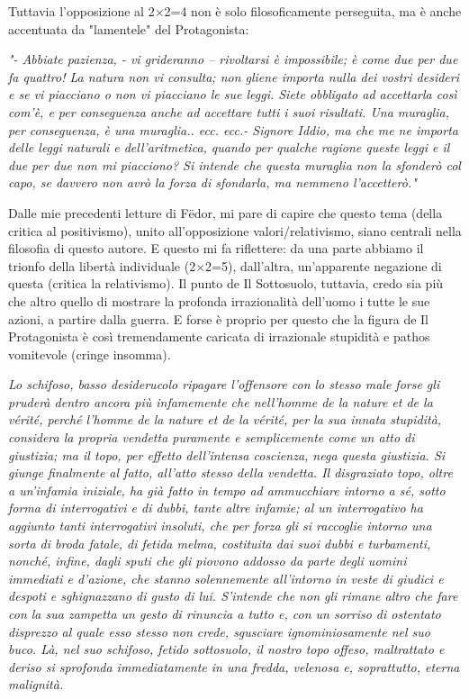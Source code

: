 \documentclass[12pt,a4paper]{report}
\theoremstyle{definition}
\theoremstyle{Theorem}
\theoremstyle{definition}
\theoremstyle{definition}
\theoremstyle{definition}
\begin{document}
Tuttavia l'opposizione al 2$\times$2=4 non è solo filosoficamente perseguita, ma è anche accentuata da "lamentele" del Protagonista: \\
\begin{center}
\textit{
	"- Abbiate pazienza, - vi grideranno – rivoltarsi è impossibile; è come due per due fa quattro! La natura non vi consulta; non gliene importa nulla dei vostri desideri e se vi piacciano o non vi piacciano le sue leggi. Siete obbligato ad accettarla così com'è, e per conseguenza anche ad accettare tutti i suoi risultati. Una muraglia, per conseguenza, è una muraglia.. ecc. ecc.-
	Signore Iddio, ma
	che me ne importa delle leggi naturali e dell’aritmetica, quando per qualche
	ragione queste leggi e il due per due non mi piacciono? Si intende che questa
	muraglia non la sfonderò col capo, se davvero non avrò la forza di sfondarla,
	ma nemmeno l’accetterò."
}
\end{center}
Dalle mie precedenti letture di Fëdor, mi pare di capire che questo tema (della critica al positivismo), unito all'opposizione valori/relativismo, siano centrali nella filosofia di questo autore. E questo mi fa riflettere: da una parte abbiamo il trionfo della libertà individuale (2$\times$2=5), dall'altra, un'apparente negazione di questa (critica la relativismo). Il punto de Il Sottosuolo, tuttavia, credo sia più che altro quello di mostrare la profonda irrazionalità dell'uomo i tutte le sue azioni, a partire dalla guerra. E forse è proprio per questo che la figura de Il Protagonista è così tremendamente caricata di irrazionale stupidità e pathos vomitevole (cringe insomma). 
\begin{center}
	\textit{ Lo schifoso, basso desiderucolo ripagare l'offensore con lo stesso male forse gli pruderà dentro ancora più infamemente che nell'homme de la nature et de la vérité, perché l'homme de la nature et de la vérité, per la sua innata stupidità, considera la propria vendetta puramente e semplicemente come un atto di giustizia; ma il topo, per effetto dell'intensa coscienza, nega questa giustizia. Si giunge finalmente al fatto, all'atto stesso della vendetta. Il disgraziato topo, oltre a un'infamia iniziale, ha già fatto in tempo ad ammucchiare intorno a sé, sotto forma di interrogativi e di dubbi, tante altre infamie; al un interrogativo ha aggiunto tanti interrogativi insoluti, che per forza gli si raccoglie intorno una sorta di broda fatale, di fetida melma,
		costituita dai suoi dubbi e turbamenti, nonché, infine, dagli sputi che gli piovono addosso
		da parte degli uomini immediati e d'azione, che stanno solennemente all'intorno in veste di giudici e despoti e sghignazzano di gusto di lui. S'intende che non gli rimane altro che fare con la sua zampetta un gesto di rinuncia a tutto e, con un sorriso di ostentato disprezzo al quale esso stesso non crede, sgusciare ignominiosamente nel suo buco. Là, nel suo schifoso,
		fetido sottosuolo, il nostro topo offeso, maltrattato e deriso si sprofonda immediatamente in una fredda, velenosa e, soprattutto, eterna malignità.}
\end{center}
\end{document}
